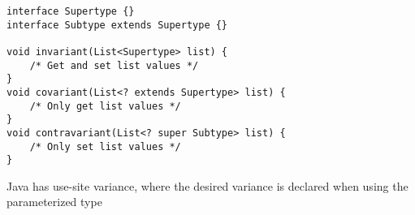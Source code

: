 \begin{algorithm}

\begin{verbatim}
interface Supertype {}
interface Subtype extends Supertype {}

void invariant(List<Supertype> list) {
    /* Get and set list values */
}
void covariant(List<? extends Supertype> list) {
    /* Only get list values */
}
void contravariant(List<? super Subtype> list) {
    /* Only set list values */
}
\end{verbatim}

\caption{Java has use-site variance, where the desired variance is declared when using the parameterized type \label{use-site-variance}}
\end{algorithm}